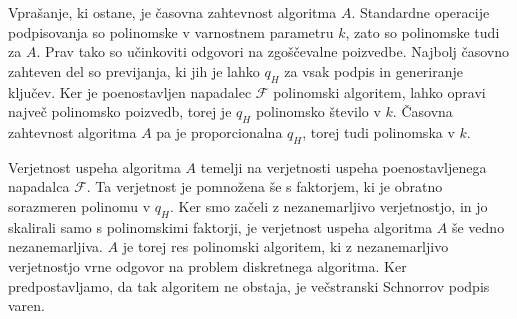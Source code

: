 \begin{dokaz}
Vprašanje, ki ostane, je časovna zahtevnost algoritma $A$. Standardne operacije podpisovanja
so polinomske v varnostnem parametru $k$, zato so polinomske tudi za $A$. Prav tako so učinkoviti
odgovori na zgoščevalne poizvedbe. Najbolj časovno zahteven del so previjanja, ki jih je lahko $q_H$
za vsak podpis in generiranje ključev. Ker je poenostavljen napadalec $\mathcal{F}$ polinomski algoritem,
lahko opravi največ polinomsko poizvedb, torej je $q_H$ polinomsko število v $k$. Časovna zahtevnost
algoritma $A$ pa je proporcionalna $q_H$, torej tudi polinomska v $k$.

Verjetnost uspeha algoritma $A$ temelji na verjetnosti uspeha poenostavljenega napadalca $\mathcal{F}$.
Ta verjetnost je pomnožena še s faktorjem, ki je obratno sorazmeren polinomu v $q_H$. Ker smo
začeli z nezanemarljivo verjetnostjo, in jo skalirali samo s polinomskimi faktorji, je verjetnost
uspeha algoritma $A$ še vedno nezanemarljiva. $A$ je torej res polinomski algoritem, ki z
nezanemarljivo verjetnostjo vrne odgovor na problem diskretnega algoritma. Ker predpostavljamo, da
tak algoritem ne obstaja, je večstranski Schnorrov podpis varen.
\end{dokaz}
